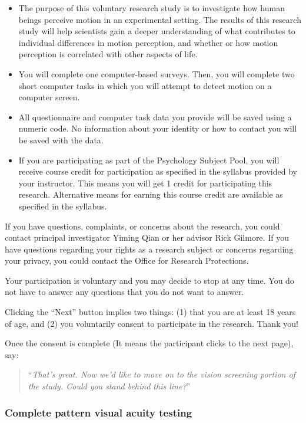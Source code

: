 \documentclass[]{article}
\providecommand{\tightlist}{%
  \setlength{\itemsep}{0pt}\setlength{\parskip}{0pt}}
\begin{document}
\begin{itemize}
\tightlist
\item
  The purpose of this voluntary research study is to investigate how
  human beings perceive motion in an experimental setting. The results
  of this research study will help scientists gain a deeper
  understanding of what contributes to individual differences in motion
  perception, and whether or how motion perception is correlated with
  other aspects of life.
\item
  You will complete one computer-based surveys. Then, you will complete
  two short computer tasks in which you will attempt to detect motion on
  a computer screen.
\item
  All questionnaire and computer task data you provide will be saved
  using a numeric code. No information about your identity or how to
  contact you will be saved with the data.
\item
  If you are participating as part of the Psychology Subject Pool, you
  will receive course credit for participation as specified in the
  syllabus provided by your instructor. This means you will get 1 credit
  for participating this research. Alternative means for earning this
  course credit are available as specified in the syllabus.
\end{itemize}

If you have questions, complaints, or concerns about the research, you
could contact principal investigator Yiming Qian or her advisor Rick
Gilmore. If you have questions regarding your rights as a research
subject or concerns regarding your privacy, you could contact the Office
for Research Protections.

Your participation is voluntary and you may decide to stop at any time.
You do not have to answer any questions that you do not want to answer.

Clicking the ``Next'' button implies two things: (1) that you are at
least 18 years of age, and (2) you voluntarily consent to participate in
the research. Thank you!

Once the consent is complete (It means the participant clicks to the
next page), say:

\begin{quote}
``\emph{That's great. Now we'd like to move on to the vision screening
portion of the study. Could you stand behind this line?}''
\end{quote}

\subsubsection{Complete pattern visual acuity
testing}\label{complete-pattern-visual-acuity-testing}
\end{document}
